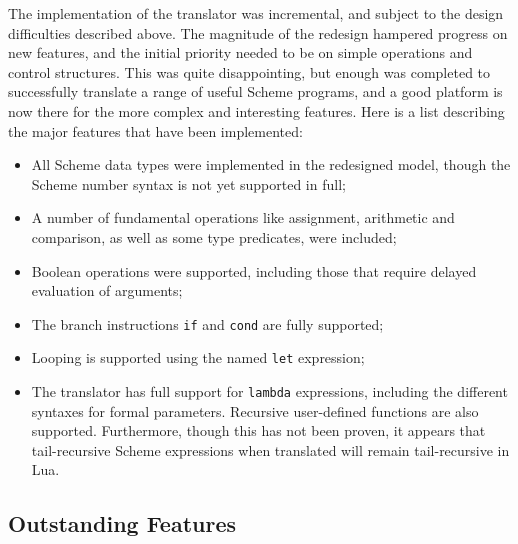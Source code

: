 The implementation of the translator was incremental, and subject to the design
difficulties described above. The magnitude of the redesign hampered progress on
new features, and the initial priority needed to be on simple operations and
control structures. This was quite disappointing, but enough was completed to
successfully translate a range of useful Scheme programs, and a good platform is
now there for the more complex and interesting features. Here is a list
describing the major features that have been implemented:
\begin{itemize}
\item All Scheme data types were implemented in the redesigned model, though the
Scheme number syntax is not yet supported in full;
\item A number of fundamental operations like assignment, arithmetic and
comparison, as well as some type predicates, were included;
\item Boolean operations were supported, including those that require delayed
evaluation of arguments;
\item The branch instructions \texttt{if} and \texttt{cond} are fully supported;
\item Looping is supported using the named \texttt{let} expression;
\item The translator has full support for \texttt{lambda} expressions, including
the different syntaxes for formal parameters. Recursive user-defined functions
are also supported. Furthermore, though this has not been proven, it appears
that tail-recursive Scheme expressions when translated will remain
tail-recursive in Lua.
\end{itemize}

\subsection{Outstanding Features}\label{sec:outstandingfeatures}

